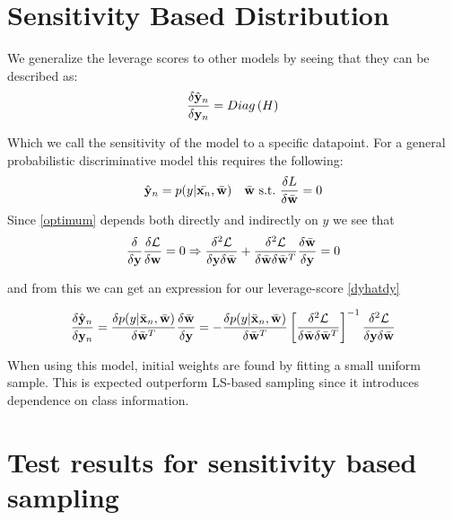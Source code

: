 \documentclass{article}
\begin{document}
\section{Sensitivity Based Distribution}

We generalize the leverage scores to other models by seeing that they can be described as: 
	    \begin{equation}
	    \label{dyhatdy}
	    \frac{\delta \hat{{\bf y}}_n}{\delta {\bf y}_n} = Diag\left(H\right)
	    \end{equation}

Which we call the sensitivity of the model to a specific datapoint. For a general probabilistic discriminative model this requires the following:
    	\begin{equation}
    	 \hat{{\bf y}}_n = p(y|\bar{{\bf x}_n},\bar{{\bf w}}) \quad \bar{{\bf w}} \  \text{s.t.} \ \frac{\delta L}{\delta\bar{{\bf w}}}=0     	\label{optimum}
    	\end{equation}
Since \ref{optimum} depends both directly and indirectly on $y$ we see that
    	\begin{equation}
    	\frac{\delta}{\delta {\bf y}} \frac{\delta \mathcal{L}}{\delta {\bf w}} = 0 
    	\Rightarrow
    	\frac{\delta^2 \mathcal{L}}{\delta {\bf y} \delta \bar{{\bf w}}} + \frac{\delta^2 \mathcal{L}}{\delta \bar{{\bf w}} \delta \bar{{\bf w}}^T} \frac{\delta \bar{{\bf w}}}{\delta {\bf y}}= 0
    	\end{equation}
    	
    	and from this we can get an expression for our leverage-score \eqref{dyhatdy}
    	
    	\begin{equation*}
    		\frac{\delta \hat{{\bf y}}_n}{\delta {\bf y}_n}=\frac{\delta p(y|\bar{{\bf x}}_n,\bar{{\bf w}})}{\delta \bar{{\bf w}}^T} \frac{\delta \bar{{\bf w}}}{\delta {\bf y}} = - \frac{\delta p(y|\bar{{\bf x}}_n,\bar{{\bf w}})}{\delta \bar{{\bf w}}^T} \left[ \frac{\delta^2 \mathcal{L}}{\delta \bar{{\bf w}} \delta \bar{{\bf w}}^T} \right]^{-1} \frac{\delta^2 \mathcal{L}}{\delta {\bf y} \delta \bar{{\bf w}}}
    	\end{equation*}
    	
    	When using this model, initial weights are found by fitting a small uniform sample. This is expected outperform LS-based sampling since it introduces dependence on class information.
%



\section{Test results for sensitivity based sampling}
\end{document}
